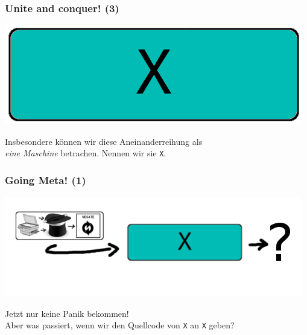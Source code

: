 \documentclass[aspectratio=169]{beamer}
\begin{document}

\begin{frame}
\frametitle{Unite and conquer! (3)}
\begin{center}
\includegraphics[scale=1.4]{images/complete_border_filled.png} 
\bigskip

Insbesondere können wir diese Aneinanderreihung als\\ \emph{eine Maschine} betrachen. Nennen wir sie \texttt{X}.
\end{center}
\end{frame}


\begin{frame}
\frametitle{Going Meta! (1)}
\begin{center}
\includegraphics[scale=1.4]{images/input.png} 
\bigskip

Jetzt nur keine Panik bekommen!\\

Aber was passiert, wenn wir den Quellcode von \texttt{X} an \texttt{X} geben?
\end{center}
\end{frame}

\end{document}
